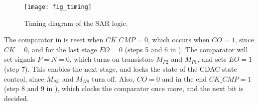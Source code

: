 \begin{figure}[t]
\centerline{\texttt{[image: fig\_timing]}}
\caption{Timing diagram of the SAR logic.}
\label{fig_timing}
\end{figure}


The comparator in  is reset when $CK\_CMP=0$, which
occurs when $CO=1$, since $CK=0$, and
for the last stage $EO=0$ (steps 5 and 6 in
). The comparator will set signals $P=N=0$, which
turns on transistors $M_{P2}$ and $M_{P1}$, and sets $EO=1$ (step
7). This enables the next stage, and locks the state of the
CDAC state control,
since $M_{N5}$ and $M_{N8}$ turn off. Also, $CO=0$ and in the end $CK\_CMP=1$ (step 8 and 9 in ),
which clocks the comparator once more, and the next bit is decided.



